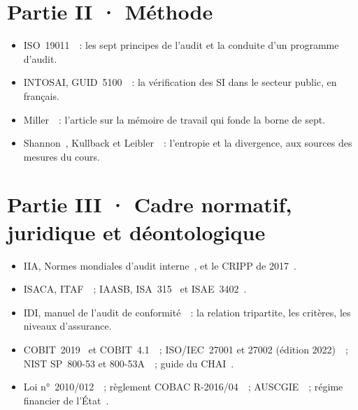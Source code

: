 \section*{Partie II · Méthode}

\begin{itemize}
    \item ISO~19011~\cite{iso19011_2018}~: les sept principes de l'audit et
          la conduite d'un programme d'audit.
    \item INTOSAI, GUID~5100~\cite{intosai2019guid5100}~: la vérification des
          SI dans le secteur public, en français.
    \item Miller~\cite{miller1956}~: l'article sur la mémoire de travail qui
          fonde la borne de sept.
    \item Shannon~\cite{shannon1948}, Kullback et Leibler~\cite{kullback1951}~:
          l'entropie et la divergence, aux sources des mesures du cours.
\end{itemize}

\section*{Partie III · Cadre normatif, juridique et déontologique}

\begin{itemize}
    \item IIA, Normes mondiales d'audit interne~\cite{iia2024gias}, et le
          CRIPP de 2017~\cite{iia2017cripp}.
    \item ISACA, ITAF~\cite{isaca2020itaf}~; IAASB, ISA~315~\cite{iaasb2019isa315}
          et ISAE~3402~\cite{iaasb2011isae3402}.
    \item IDI, manuel de l'audit de conformité~\cite{idi2021conformite}~:
          la relation tripartite, les critères, les niveaux d'assurance.
    \item COBIT~2019~\cite{isaca2018cobitintro,isaca2018cobitobjectifs} et
          COBIT~4.1~\cite{itgi2007cobit41}~; ISO/IEC~27001 et 27002 (édition
          2022)~\cite{iso27001_2022,iso27002_2022}~; NIST SP~800-53 et
          800-53A~\cite{nist2020sp80053,nist2022sp80053a}~; guide du
          CHAI~\cite{chai2014guide}.
    \item Loi n°~2010/012~\cite{loi2010012}~; règlement COBAC
          R-2016/04~\cite{cobac2016r04}~; AUSCGIE~\cite{ohada2014auscgie}~;
          régime financier de l'État~\cite{minfi2023regimefinancier}.
\end{itemize}

